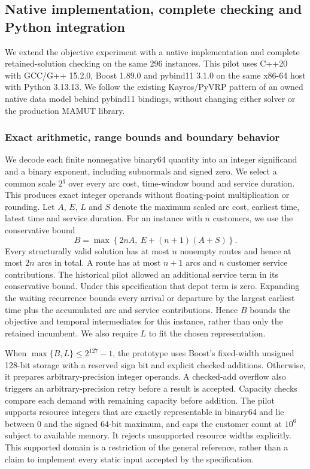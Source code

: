\FloatBarrier
\subsection{Native implementation, complete checking and Python integration}\label{sec:native-evidence}
We extend the objective experiment with a native implementation and complete retained-solution checking on the same 296 instances. This pilot uses C++20 with GCC/G++ 15.2.0, Boost 1.89.0 and pybind11 3.1.0 on the same x86-64 host with Python 3.13.13. We follow the existing Kayros/PyVRP pattern of an owned native data model behind pybind11 bindings, without changing either solver or the production MAMUT library.

\subsubsection{Exact arithmetic, range bounds and boundary behavior}
We decode each finite nonnegative binary64 quantity into an integer significand and a binary exponent, including subnormals and signed zero. We select a common scale $2^q$ over every arc cost, time-window bound and service duration. This produces exact integer operands without floating-point multiplication or rounding. Let $A$, $E$, $L$ and $S$ denote the maximum scaled arc cost, earliest time, latest time and service duration. For an instance with $n$ customers, we use the conservative bound
\[
    B = \max\!\left\{2nA,\ E+(n+1)(A+S)\right\}.
\]
Every structurally valid solution has at most $n$ nonempty routes and hence at most $2n$ arcs in total. A route has at most $n+1$ arcs and $n$ customer service contributions. The historical pilot allowed an additional service term in its conservative bound. Under this specification that depot term is zero. Expanding the waiting recurrence bounds every arrival or departure by the largest earliest time plus the accumulated arc and service contributions. Hence $B$ bounds the objective and temporal intermediates for this instance, rather than only the retained incumbent. We also require $L$ to fit the chosen representation.

When $\max\{B,L\}\leq 2^{127}-1$, the prototype uses Boost's fixed-width unsigned 128-bit storage with a reserved sign bit and explicit checked additions. Otherwise, it prepares arbitrary-precision integer operands. A checked-add overflow also triggers an arbitrary-precision retry before a result is accepted. Capacity checks compare each demand with remaining capacity before addition. The pilot supports resource integers that are exactly representable in binary64 and lie between 0 and the signed 64-bit maximum, and caps the customer count at $10^6$ subject to available memory. It rejects unsupported resource widths explicitly. This supported domain is a restriction of the general reference, rather than a claim to implement every static input accepted by the specification.

